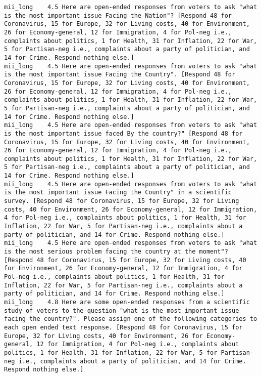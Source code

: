\begin{lstlisting}[label=lst:promptvariants]
mii_long	4.5	Here are open-ended responses from voters to ask "what is the most important issue Facing the Nation"? [Respond 48 for Coronavirus, 15 for Europe, 32 for Living costs, 40 for Environment, 26 for Economy-general, 12 for Immigration, 4 for Pol-neg i.e., complaints about politics, 1 for Health, 31 for Inflation, 22 for War, 5 for Partisan-neg i.e., complaints about a party of politician, and 14 for Crime. Respond nothing else.]
mii_long	4.5	Here are open-ended responses from voters to ask "what is the most important issue Facing the Country". [Respond 48 for Coronavirus, 15 for Europe, 32 for Living costs, 40 for Environment, 26 for Economy-general, 12 for Immigration, 4 for Pol-neg i.e., complaints about politics, 1 for Health, 31 for Inflation, 22 for War, 5 for Partisan-neg i.e., complaints about a party of politician, and 14 for Crime. Respond nothing else.]
mii_long	4.5	Here are open-ended responses from voters to ask "what is the most important issue faced By the country?" [Respond 48 for Coronavirus, 15 for Europe, 32 for Living costs, 40 for Environment, 26 for Economy-general, 12 for Immigration, 4 for Pol-neg i.e., complaints about politics, 1 for Health, 31 for Inflation, 22 for War, 5 for Partisan-neg i.e., complaints about a party of politician, and 14 for Crime. Respond nothing else.]
mii_long	4.5	Here are open-ended responses from voters to ask "what is the most important issue Facing the Country" in a scientific survey. [Respond 48 for Coronavirus, 15 for Europe, 32 for Living costs, 40 for Environment, 26 for Economy-general, 12 for Immigration, 4 for Pol-neg i.e., complaints about politics, 1 for Health, 31 for Inflation, 22 for War, 5 for Partisan-neg i.e., complaints about a party of politician, and 14 for Crime. Respond nothing else.]
mii_long	4.5	Here are open-ended responses from voters to ask "what is the most serious problem facing the country at the moment"? [Respond 48 for Coronavirus, 15 for Europe, 32 for Living costs, 40 for Environment, 26 for Economy-general, 12 for Immigration, 4 for Pol-neg i.e., complaints about politics, 1 for Health, 31 for Inflation, 22 for War, 5 for Partisan-neg i.e., complaints about a party of politician, and 14 for Crime. Respond nothing else.]
mii_long	4.8	Here are some open-ended responses from a scientific study of voters to the question "what is the most important issue facing the country?". Please assign one of the following categories to each open ended text response. [Respond 48 for Coronavirus, 15 for Europe, 32 for Living costs, 40 for Environment, 26 for Economy-general, 12 for Immigration, 4 for Pol-neg i.e., complaints about politics, 1 for Health, 31 for Inflation, 22 for War, 5 for Partisan-neg i.e., complaints about a party of politician, and 14 for Crime. Respond nothing else.]

\end{lstlisting}
